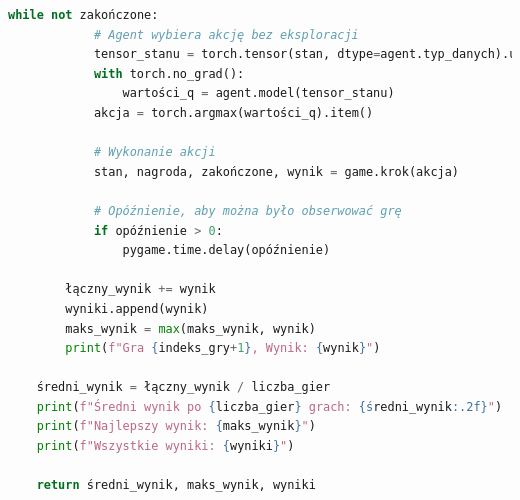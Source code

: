 \documentclass[a4paper,12pt]{article}
\begin{document}
\begin{lstlisting}[language=Python]
        while not zakończone:
            # Agent wybiera akcję bez eksploracji
            tensor_stanu = torch.tensor(stan, dtype=agent.typ_danych).unsqueeze(0).to(agent.device)
            with torch.no_grad():
                wartości_q = agent.model(tensor_stanu)
            akcja = torch.argmax(wartości_q).item()
            
            # Wykonanie akcji
            stan, nagroda, zakończone, wynik = game.krok(akcja)
            
            # Opóźnienie, aby można było obserwować grę
            if opóźnienie > 0:
                pygame.time.delay(opóźnienie)
            
        łączny_wynik += wynik
        wyniki.append(wynik)
        maks_wynik = max(maks_wynik, wynik)
        print(f"Gra {indeks_gry+1}, Wynik: {wynik}")
    
    średni_wynik = łączny_wynik / liczba_gier
    print(f"Średni wynik po {liczba_gier} grach: {średni_wynik:.2f}")
    print(f"Najlepszy wynik: {maks_wynik}")
    print(f"Wszystkie wyniki: {wyniki}")
    
    return średni_wynik, maks_wynik, wyniki
\end{lstlisting}
\end{document}
